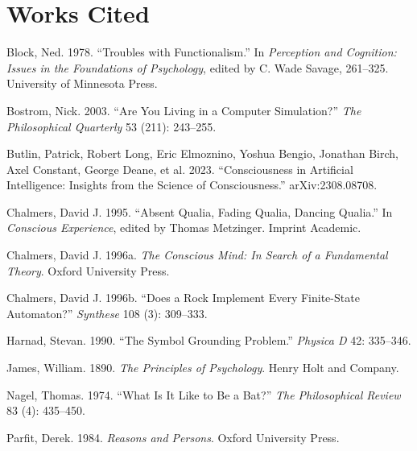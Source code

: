 \documentclass[11pt]{article}
\begin{document}
\section*{Works Cited}
\begin{flushleft}
\setlength{\parindent}{-2em}
\setlength{\leftskip}{2em}

Block, Ned. 1978. ``Troubles with Functionalism.'' In \emph{Perception and Cognition: Issues in the Foundations of Psychology}, edited by C. Wade Savage, 261--325. University of Minnesota Press.\par
\vspace{0.4em}
Bostrom, Nick. 2003. ``Are You Living in a Computer Simulation?'' \emph{The Philosophical Quarterly} 53 (211): 243--255.\par
\vspace{0.4em}
Butlin, Patrick, Robert Long, Eric Elmoznino, Yoshua Bengio, Jonathan Birch, Axel Constant, George Deane, et al. 2023. ``Consciousness in Artificial Intelligence: Insights from the Science of Consciousness.'' arXiv:2308.08708.\par
\vspace{0.4em}
Chalmers, David J. 1995. ``Absent Qualia, Fading Qualia, Dancing Qualia.'' In \emph{Conscious Experience}, edited by Thomas Metzinger. Imprint Academic.\par
\vspace{0.4em}
Chalmers, David J. 1996a. \emph{The Conscious Mind: In Search of a Fundamental Theory}. Oxford University Press.\par
\vspace{0.4em}
Chalmers, David J. 1996b. ``Does a Rock Implement Every Finite-State Automaton?'' \emph{Synthese} 108 (3): 309--333.\par
\vspace{0.4em}
Harnad, Stevan. 1990. ``The Symbol Grounding Problem.'' \emph{Physica D} 42: 335--346.\par
\vspace{0.4em}
James, William. 1890. \emph{The Principles of Psychology}. Henry Holt and Company.\par
\vspace{0.4em}
Nagel, Thomas. 1974. ``What Is It Like to Be a Bat?'' \emph{The Philosophical Review} 83 (4): 435--450.\par
\vspace{0.4em}
Parfit, Derek. 1984. \emph{Reasons and Persons}. Oxford University Press.\par
\vspace{0.4em}

\end{flushleft}
\end{document}
